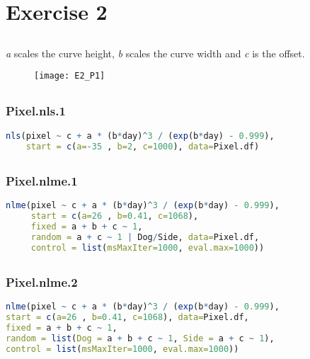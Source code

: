 \documentclass[a4paper,12pt]{article}
\begin{document}
	\section{Exercise 2}
	
	\subsection{}
	\textit{a} scales the curve height, \textit{b} scales the curve width and \textit{c} is the offset.
	\begin{figure}[h!]
		\centering
		\texttt{[image: E2\_P1]}
	\end{figure}

	\subsection{}
	\subsubsection*{Pixel.nls.1}
	\begin{lstlisting}[language=R]
nls(pixel ~ c + a * (b*day)^3 / (exp(b*day) - 0.999),
    start = c(a=-35 , b=2, c=1000), data=Pixel.df)
	\end{lstlisting}
	
	\subsection{}
	\subsubsection*{Pixel.nlme.1}
	\begin{lstlisting}[language=R]
nlme(pixel ~ c + a * (b*day)^3 / (exp(b*day) - 0.999),
     start = c(a=26 , b=0.41, c=1068),
     fixed = a + b + c ~ 1,
     random = a + c ~ 1 | Dog/Side, data=Pixel.df,
     control = list(msMaxIter=1000, eval.max=1000))
	\end{lstlisting}
	
	\subsection{}
	\subsubsection*{Pixel.nlme.2}
	\begin{lstlisting}[language=R]
nlme(pixel ~ c + a * (b*day)^3 / (exp(b*day) - 0.999),
start = c(a=26 , b=0.41, c=1068), data=Pixel.df,
fixed = a + b + c ~ 1,
random = list(Dog = a + b + c ~ 1, Side = a + c ~ 1),
control = list(msMaxIter=1000, eval.max=1000))
	\end{lstlisting}
	
\end{document}
